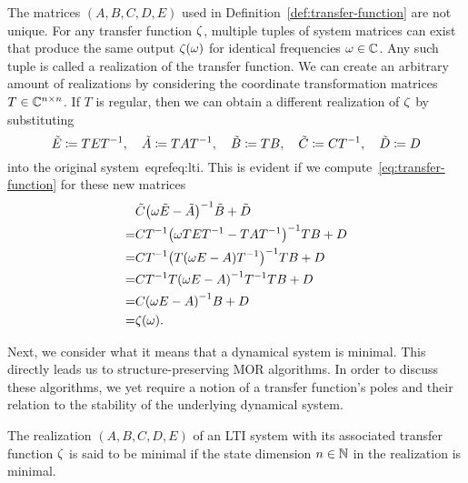 \begin{remark}
    The matrices $(A, B, C, D, E)$ used in Definition~\ref{def:transfer-function} are not unique.
    For any transfer function $\zeta$, multiple tuples of system matrices can exist that produce the same output $\zeta(\omega)$ for identical frequencies $\omega \in \mathbb{C}$.
    Any such tuple is called a realization of the transfer function.
    We can create an arbitrary amount of realizations by considering the coordinate transformation matrices $T \in \mathbb{C}^{n \times n}$.
    If $T$ is regular, then we can obtain a different realization of $\zeta$ by substituting
    \begin{equation*}
        \tilde{E} \coloneqq T E T\inv,\quad \tilde{A} \coloneqq T A T\inv,\quad \tilde{B} \coloneqq T B,\quad \tilde{C} \coloneqq C T\inv,\quad \tilde{D} \coloneqq D
    \end{equation*}
    into the original system~eqref{eq:lti}.
    This is evident if we compute~\eqref{eq:transfer-function} for these new matrices
    \begin{align*}
        &\tilde{C} {\left( \omega \tilde{E} - \tilde{A} \right)}\inv \tilde{B} + \tilde{D} \\
        = &C T\inv {\left( \omega T E T\inv - T A T\inv \right)}\inv T B + D \\
        = &C T\inv {\left( T (\omega E - A) T\inv \right)}\inv T B + D \\
        = &C T\inv T {\left( \omega E - A \right)}\inv T\inv T B + D \\
        = &C {(\omega E - A)}\inv B + D \\
        = &\tfunc(\omega).
    \end{align*}
\end{remark}

Next, we consider what it means that a dynamical system is minimal.
This directly leads us to structure-preserving \ac{MOR} algorithms.
In order to discuss these algorithms, we yet require a notion of a transfer function's poles and their relation to the stability of the underlying dynamical system.

\begin{definition}\label{def:minimal-system}
    The realization $(A, B, C, D, E)$ of an \ac{LTI} system with its associated transfer function $\zeta$ is said to be minimal if the state dimension $n \in \mathbb{N}$ in the realization is minimal.
\end{definition}

